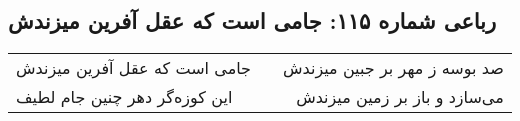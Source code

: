 \begin{center}
\section*{رباعی شماره ۱۱۵: جامی است که عقل آفرین میزندش}
\label{sec:sh115}
\begin{longtable}{l p{0.5cm} r}
جامی است که عقل آفرین میزندش
&&
صد بوسه ز مهر بر جبین میزندش
\\
این کوزه‌گر دهر چنین جام لطیف
&&
می‌سازد و باز بر زمین میزندش
\\
\end{longtable}
\end{center}

